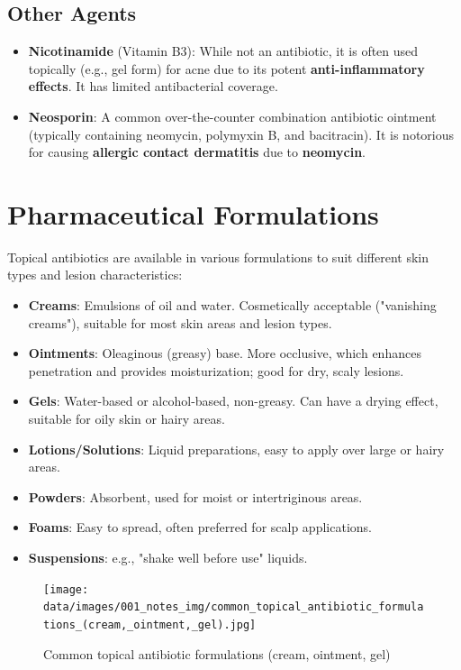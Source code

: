 \documentclass{article}
\begin{document}
\subsection*{Other Agents}
\begin{itemize}
    \item \textbf{Nicotinamide} (Vitamin B3): While not an antibiotic, it is often used topically (e.g., gel form) for acne due to its potent \textbf{anti-inflammatory effects}. It has limited antibacterial coverage.
    \item \textbf{Neosporin}: A common over-the-counter combination antibiotic ointment (typically containing neomycin, polymyxin B, and bacitracin). It is notorious for causing \textbf{allergic contact dermatitis} due to \textbf{neomycin}.
\end{itemize}

\section*{Pharmaceutical Formulations}

Topical antibiotics are available in various formulations to suit different skin types and lesion characteristics:
\begin{itemize}
    \item \textbf{Creams}: Emulsions of oil and water. Cosmetically acceptable ("vanishing creams"), suitable for most skin areas and lesion types.
    \item \textbf{Ointments}: Oleaginous (greasy) base. More occlusive, which enhances penetration and provides moisturization; good for dry, scaly lesions.
    \item \textbf{Gels}: Water-based or alcohol-based, non-greasy. Can have a drying effect, suitable for oily skin or hairy areas.
    \item \textbf{Lotions/Solutions}: Liquid preparations, easy to apply over large or hairy areas.
    \item \textbf{Powders}: Absorbent, used for moist or intertriginous areas.
    \item \textbf{Foams}: Easy to spread, often preferred for scalp applications.
    \item \textbf{Suspensions}: e.g., "shake well before use" liquids.
\end{itemize}

\begin{figure}[h]
    \centering
    \texttt{[image: data/images/001\_notes\_img/common\_topical\_antibiotic\_formulations\_(cream,\_ointment,\_gel).jpg]}
    \caption{Common topical antibiotic formulations (cream, ointment, gel)}
    \label{fig:common_topical_antibiotic_formulations_(cream,_ointment,_gel)}
\end{figure}
\end{document}
